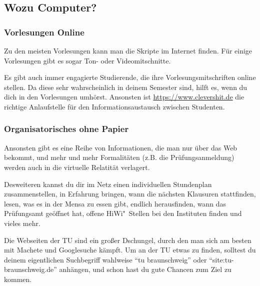 	\subsection{Wozu Computer?}
		\subsubsection{Vorlesungen Online}
			Zu den meisten Vorlesungen kann man die Skripte im Internet finden. Für einige Vorlesungen gibt es sogar Ton- oder Videomitschnitte.

			Es gibt auch immer engagierte Studierende, die ihre Vorlesungsmitschriften online stellen. Da diese sehr wahrscheinlich in deinem Semester sind, hilft es, wenn du dich in den Vorlesungen umhörst. Ansonsten ist \url{https://www.clevershit.de} die richtige Anlaufstelle für den Informationsaustausch zwischen Studenten.

		\subsubsection{Organisatorisches ohne Papier}
			Ansonsten gibt es eine Reihe von Informationen, die man nur über das Web bekommt, und mehr und mehr Formalitäten (z.B. die Prüfungsanmeldung) werden auch in die virtuelle Relatität verlagert.

			Desweiteren kannst du dir im Netz einen individuellen Stundenplan zusammenstellen, in Erfahrung bringen, wann die nächsten Klausuren stattfinden, lesen, was es in der Mensa zu essen gibt, endlich herausfinden, wann das Prüfungsamt geöffnet hat,  offene HiWi"~Stellen bei den Instituten finden und vieles mehr.

			Die Webseiten der TU sind ein großer Dschungel, durch den man sich am besten  mit Machete und Googlesuche kämpft. Um an der TU etwas zu finden, solltest du deinem eigentlichen Suchbegriff wahlweise \enquote{tu braunschweig} oder \enquote{site:tu-braunschweig.de} anhängen, und schon hast du gute Chancen zum Ziel zu kommen.

